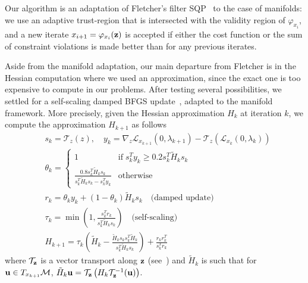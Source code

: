 Our algorithm is an adaptation of Fletcher's filter SQP~\cite{fletcher:mathprog:2000} to the case of manifolds: we use an adaptive trust-region that is intersected with the validity region of $\varphi_{x_i}$, and a new iterate $x_{i+1} = \varphi_{x_i}({\bf z})$ is accepted if either the cost function or the sum of constraint violations is made better than for any previous iterates.

Aside from the manifold adaptation, our main departure from Fletcher is in the Hessian computation where we used an approximation, since the exact one is too expensive to compute in our problems.
After testing several possibilities, we settled for a self-scaling damped BFGS update~\cite{nocedal:mp:1993,nocedal:book:2006}, adapted to the manifold framework.
More precisely, given the Hessian approximation $H_k$ at iteration $k$, we compute the approximation $H_{k+1}$ as follows
\begin{align}
	&s_k = \mathcal{T}_z(z), \quad y_k = \nabla_z \mathcal{L}_{x_{k+1}}(0,\lambda_{k+1}) - \mathcal{T}_z(\mathcal{L}_{x_{k}}(0,\lambda_{k})) \nonumber\\
	&\theta_k = \left\{\begin{array}{ll}
		1 & \mbox{if} \; s_k^T y_k \geq 0.2 s_k^T \tilde{H}_k s_k \\
		\frac{0.8 s_k^T \tilde{H}_k s_k}{s_k^T \tilde{H}_k s_k - s_k^T y_k} & \mbox{otherwise}
	\end{array}\right. \nonumber \\
	&r_k = \theta_k y_k + \left(1-\theta_k\right) \tilde{H}_k s_k \quad \mbox{(damped update)} \nonumber \\
	&\tau_k = \min\left(1, \frac{s_k^T r_k}{s_k^T \tilde{H}_k s_k} \right) \quad \mbox{(self-scaling)} \nonumber \\
	&H_{k+1} = \tau_k \left(\tilde{H}_k - \frac{\tilde{H}_k s_k s_k^T \tilde{H}_k}{s_k^T \tilde{H}_k s_k} \right) + \frac{r_k r_k^T}{s_k^T r_k} \nonumber
\end{align}
where $\mathcal{T}_{\bf z}$ is a vector transport along ${\bf z}$ (see~\cite{absil:book:2008}) and $\tilde{H}_k$ is such that for ${\bf u} \in T_{x_{k+1}} \mathcal{M}$, $\tilde{H}_k {\bf u} = \mathcal{T}_{\bf z}\left(H_k \mathcal{T}_{\bf z}^{-1}({\bf u}) \right)$.

